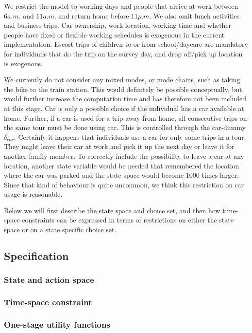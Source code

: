 We restrict the model to working days and people that arrive at work between $6\unit{a.m.}$ and $11\unit{a.m.}$ and return home before $11\unit{p.m}$. We also omit lunch activities and business trips. Car ownership, work location, working time and whether people have fixed or flexible working schedules is exogenous in the current implementation. Escort trips of children to or from school/daycare are mandatory for individuals that do the trip on the survey day, and drop off/pick up location is exogenous. 

We currently do not consider any mixed modes, or mode chains, such as taking the bike to the train station. This would definitely be possible conceptually, but would further increase the computation time and has therefore not been included at this stage. Car is only a possible choice if the individual has a car available at home. Further, if a car is used for a trip away from home, all consecutive trips on the same tour must be done using car. This is controlled through the car-dummy $\delta_{car}$. Certainly it happens that individuals use a car for only some trips in a tour. They might leave their car at work and pick it up the next day or leave it for another family member. To correctly include the possibility to leave a car at any location, another state variable would be needed that remembered the location where the car was parked and the state space would become 1000-times larger. Since that kind of behaviour is quite uncommon, we think this restriction on car usage is reasonable. %

Below we will first describe the state space and choice set, and then how time-space constraints can be expressed in terms of restrictions on either the state space or on a state specific choice set.



\subsection{Specification}
\subsubsection{State and action space}

\subsubsection{Time-space constraint}

\subsubsection{One-stage utility functions}


